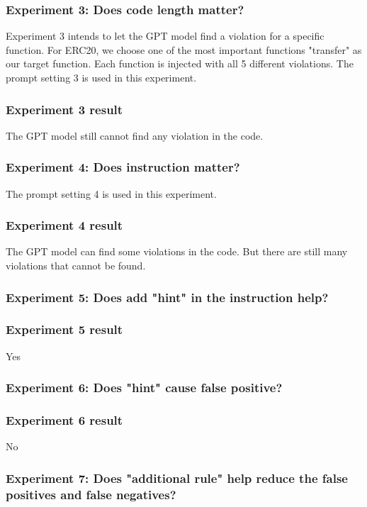 \subsubsection{ Experiment 3: Does code length matter? }
Experiment 3 intends to let the GPT model find a violation for a specific function.
For ERC20, we choose one of the most important functions "transfer" as our target function.
Each function is injected with all 5 different violations.
The prompt setting 3 is used in this experiment. 

\subsubsection{ Experiment 3 result }
The GPT model still cannot find any violation in the code.



\subsubsection{ Experiment 4: Does instruction matter? }
The prompt setting 4 is used in this experiment.

\subsubsection{ Experiment 4 result }
The GPT model can find some violations in the code. But there are still many violations that cannot be found.


\subsubsection{ Experiment 5: Does add "hint" in the instruction help? }

\subsubsection{ Experiment 5 result}
Yes

\subsubsection{ Experiment 6: Does "hint" cause false positive? }
\subsubsection{ Experiment 6 result }
No
\subsubsection{ Experiment 7: Does "additional rule" help reduce the false positives and false negatives? }
